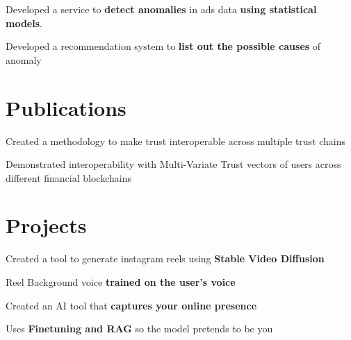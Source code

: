 \documentclass[]{deedy-resume-openfont}
\begin{document}
\begin{minipage}[t]{0.66\textwidth}
{}
\begin{tightemize}
\item Developed a service to \textbf{detect anomalies} in ads data \textbf{using statistical models}.
\item Developed a recommendation system to \textbf{list out the possible causes }of anomaly
\end{tightemize}



\section{Publications}
\begin{tightemize}
\item Created a methodology to make trust interoperable across multiple trust chains
\item Demonstrated interoperability with Multi-Variate Trust vectors of users across different financial blockchains
\end{tightemize}

\section{Projects}
\begin{tightemize}
\item Created a tool to generate instagram reels using \textbf{Stable Video Diffusion}\\
\item Reel Background voice \textbf{trained on the user's voice}
\end{tightemize}
\sectionsep

\begin{tightemize}
\item Created an AI tool that \textbf{captures your online presence}\\
\item Uses \textbf{Finetuning and RAG} so the model pretends to be you 
\end{tightemize}
\sectionsep


\end{minipage}
\end{document}
